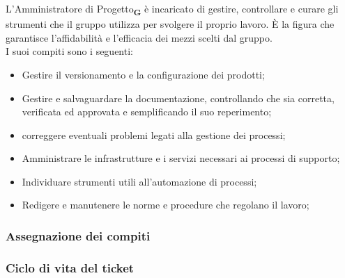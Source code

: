 L’Amministratore di Progetto\textsubscript{\textbf{G}} è incaricato di gestire, controllare e curare gli strumenti che il gruppo utilizza per svolgere il proprio lavoro. È la figura che garantisce l’affidabilità e l’efficacia dei mezzi scelti dal gruppo.\\
I suoi compiti sono i seguenti:
\begin {itemize}
    \item Gestire il versionamento e la configurazione dei prodotti; 
    \item Gestire e salvaguardare la documentazione, controllando che sia corretta, verificata ed approvata e semplificando il suo reperimento;
    \item correggere eventuali problemi legati alla gestione dei processi;
    \item Amministrare le infrastrutture e i servizi necessari ai processi di supporto;
    \item Individuare strumenti utili all'automazione di processi;
    \item Redigere e manutenere le norme e procedure che regolano il lavoro;
\end {itemize}
\subsubsection{Assegnazione dei compiti}
\subsubsection{Ciclo di vita del ticket}
